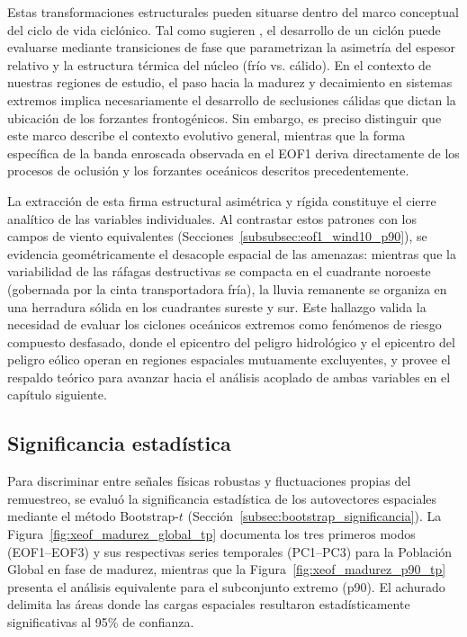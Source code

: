 Estas transformaciones estructurales pueden situarse dentro del marco conceptual del ciclo de vida ciclónico. Tal como sugieren \citet{hart2003cyclone}, el desarrollo de un ciclón puede evaluarse mediante transiciones de fase que parametrizan la asimetría del espesor relativo y la estructura térmica del núcleo (frío vs. cálido). En el contexto de nuestras regiones de estudio, el paso hacia la madurez y decaimiento en sistemas extremos implica necesariamente el desarrollo de seclusiones cálidas que dictan la ubicación de los forzantes frontogénicos. Sin embargo, es preciso distinguir que este marco describe el contexto evolutivo general, mientras que la forma específica de la banda enroscada observada en el EOF1 deriva directamente de los procesos de oclusión y los forzantes oceánicos descritos precedentemente.

La extracción de esta firma estructural asimétrica y rígida constituye el cierre analítico de las variables individuales. Al contrastar estos patrones con los campos de viento equivalentes (Secciones~\ref{subsubsec:eof1_wind10_p90}), se evidencia geométricamente el desacople espacial de las amenazas: mientras que la variabilidad de las ráfagas destructivas se compacta en el cuadrante noroeste (gobernada por la cinta transportadora fría), la lluvia remanente se organiza en una herradura sólida en los cuadrantes sureste y sur. Este hallazgo valida la necesidad de evaluar los ciclones oceánicos extremos como fenómenos de riesgo compuesto desfasado, donde el epicentro del peligro hidrológico y el epicentro del peligro eólico operan en regiones espaciales mutuamente excluyentes, y provee el respaldo teórico para avanzar hacia el análisis acoplado de ambas variables en el capítulo siguiente.


\subsection{Significancia estadística}\label{subsec:significancia_tp}

Para discriminar entre señales físicas robustas y fluctuaciones propias del remuestreo, se evaluó la significancia estadística de los autovectores espaciales mediante el método Bootstrap-$t$ (Sección~\ref{subsec:bootstrap_significancia}). La Figura~\ref{fig:xeof_madurez_global_tp} documenta los tres primeros modos (EOF1--EOF3) y sus respectivas series temporales (PC1--PC3) para la Población Global en fase de madurez, mientras que la Figura~\ref{fig:xeof_madurez_p90_tp} presenta el análisis equivalente para el subconjunto extremo (p90). El achurado delimita las áreas donde las cargas espaciales resultaron estadísticamente significativas al 95\% de confianza.

